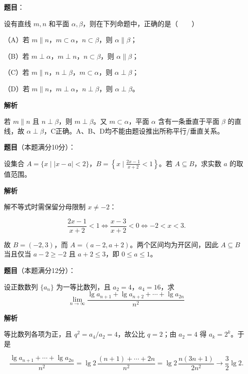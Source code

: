\begin{answer}

\textbf{题目}：

设有直线 $m,n$ 和平面 $\alpha,\beta$，则在下列命题中，正确的是\mbox{（　　）}

（A）若 $m\parallel n$，$m\subset\alpha$，$n\subset\beta$，则 $\alpha\parallel\beta$；

（B）若 $m\perp\alpha$，$m\perp n$，$n\subset\beta$，则 $\alpha\parallel\beta$；

（C）若 $m\parallel n$，$n\perp\beta$，$m\subset\alpha$，则 $\alpha\perp\beta$；

（D）若 $m\parallel n$，$m\perp\alpha$，$n\perp\beta$，则 $\alpha\perp\beta$。

\textbf{解析}

若 $m\parallel n$ 且 $n\perp\beta$，则 $m\perp\beta$。又 $m\subset\alpha$，平面 $\alpha$ 含有一条垂直于平面 $\beta$ 的直线，故 $\alpha\perp\beta$，C正确。A、B、D均不能由题设推出所称平行/垂直关系。


\end{answer}
\begin{answer}

\textbf{题目}（本题满分10分）：

设集合 $A=\{x\mid |x-a|<2\}$，$B=\left\{x\mid\frac{2x-1}{x+2}<1\right\}$。若 $A\subseteq B$，求实数 $a$ 的取值范围。

\textbf{解析}

解不等式时需保留分母限制 $x\ne-2$：

\nopagebreak[4]
\[
\frac{2x-1}{x+2}<1\iff\frac{x-3}{x+2}<0\iff -2<x<3.
\]

故 $B=(-2,3)$，而 $A=(a-2,a+2)$。两个区间均为开区间，因此 $A\subseteq B$ 当且仅当 $a-2\ge-2$ 且 $a+2\le3$，即 $0\le a\le1$。


\end{answer}
\begin{answer}

\textbf{题目}（本题满分12分）：

设正数数列 $\{a_n\}$ 为一等比数列，且 $a_2=4$，$a_4=16$，求
\nopagebreak[4]
\[
\lim_{n\to\infty}\frac{\lg a_{n+1}+\lg a_{n+2}+\cdots+\lg a_{2n}}{n^2}
\]

\textbf{解析}

等比数列各项为正，且 $q^2=a_4/a_2=4$，故公比 $q=2$；由 $a_2=4$ 得 $a_k=2^k$。于是

\nopagebreak[4]
\[
\frac{\lg a_{n+1}+\cdots+\lg a_{2n}}{n^2}
=\lg2\,\frac{(n+1)+\cdots+2n}{n^2}
=\lg2\,\frac{n(3n+1)}{2n^2}\longrightarrow\frac32\lg2.
\]


\end{answer}
